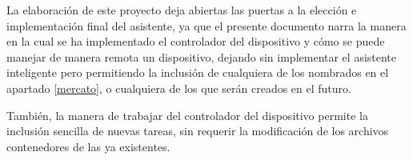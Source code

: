 La elaboración de este proyecto deja abiertas las puertas a la elección e implementación final del asistente, ya que el presente documento narra la manera en la cual se ha implementado el controlador del dispositivo y cómo se puede manejar de manera remota un dispositivo, dejando sin implementar el asistente inteligente pero permitiendo la inclusión de cualquiera de los nombrados en el apartado \ref{mercato}, o cualquiera de los que serán creados en el futuro.

También, la manera de trabajar del controlador del dispositivo permite la inclusión sencilla de nuevas tareas, sin requerir la modificación de los archivos contenedores de las ya existentes.